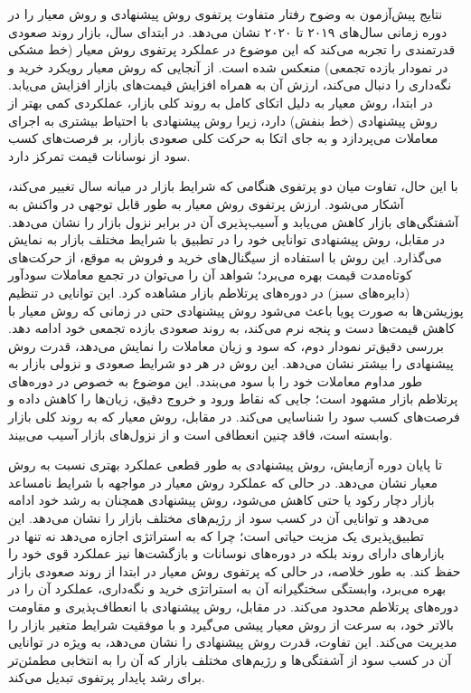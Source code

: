 نتایج پیش‌آزمون به وضوح رفتار متفاوت پرتفوی روش پیشنهادی و روش معیار را در دوره زمانی سال‌های ۲۰۱۹ تا ۲۰۲۰ نشان می‌دهد. در ابتدای سال، بازار روند صعودی قدرتمندی را تجربه می‌کند که این موضوع در عملکرد پرتفوی روش معیار (خط مشکی در نمودار بازده تجمعی) منعکس شده است. از آنجایی که روش معیار رویکرد خرید و نگه‌داری را دنبال می‌کند، ارزش آن به همراه افزایش قیمت‌های بازار افزایش می‌یابد. در ابتدا، روش معیار به دلیل اتکای کامل به روند کلی بازار، عملکردی کمی بهتر از روش پیشنهادی (خط بنفش) دارد، زیرا روش پیشنهادی با احتیاط بیشتری به اجرای معاملات می‌پردازد و به جای اتکا به حرکت کلی صعودی بازار، بر فرصت‌های کسب سود از نوسانات قیمت تمرکز دارد.

با این حال، تفاوت میان دو پرتفوی هنگامی که شرایط بازار در میانه سال تغییر می‌کند، آشکار می‌شود. ارزش پرتفوی روش معیار به طور قابل توجهی در واکنش به آشفتگی‌های بازار کاهش می‌یابد و آسیب‌پذیری آن در برابر نزول بازار را نشان می‌دهد. در مقابل، روش پیشنهادی توانایی خود را در تطبیق با شرایط مختلف بازار به نمایش می‌گذارد. این روش با استفاده از سیگنال‌های خرید و فروش به موقع، از حرکت‌های کوتاه‌مدت قیمت بهره می‌برد؛ شواهد آن را می‌توان در تجمع معاملات سودآور (دایره‌های سبز) در دوره‌های پرتلاطم بازار مشاهده کرد. این توانایی در تنظیم پوزیشن‌ها به صورت پویا باعث می‌شود روش پیشنهادی حتی در زمانی که روش معیار با کاهش قیمت‌ها دست و پنجه نرم می‌کند، به روند صعودی بازده تجمعی خود ادامه دهد. بررسی دقیق‌تر نمودار دوم، که سود و زیان معاملات را نمایش می‌دهد، قدرت روش پیشنهادی را بیشتر نشان می‌دهد. این روش در هر دو شرایط صعودی و نزولی بازار به طور مداوم معاملات خود را با سود می‌بندد. این موضوع به خصوص در دوره‌های پرتلاطم بازار مشهود است؛ جایی که نقاط ورود و خروج دقیق، زیان‌ها را کاهش داده و فرصت‌های کسب سود را شناسایی می‌کند. در مقابل، روش معیار که به روند کلی بازار وابسته است، فاقد چنین انعطافی است و از نزول‌های بازار آسیب می‌بیند.

تا پایان دوره آزمایش، روش پیشنهادی به طور قطعی عملکرد بهتری نسبت به روش معیار نشان می‌دهد. در حالی که عملکرد روش معیار در مواجهه با شرایط نامساعد بازار دچار رکود یا حتی کاهش می‌شود، روش پیشنهادی همچنان به رشد خود ادامه می‌دهد و توانایی آن در کسب سود از رژیم‌های مختلف بازار را نشان می‌دهد. این تطبیق‌پذیری یک مزیت حیاتی است؛ چرا که به استراتژی اجازه می‌دهد نه تنها در بازارهای دارای روند بلکه در دوره‌های نوسانات و بازگشت‌ها نیز عملکرد قوی خود را حفظ کند. به طور خلاصه، در حالی که پرتفوی روش معیار در ابتدا از روند صعودی بازار بهره می‌برد، وابستگی سختگیرانه آن به استراتژی خرید و نگه‌داری، عملکرد آن را در دوره‌های پرتلاطم محدود می‌کند. در مقابل، روش پیشنهادی با انعطاف‌پذیری و مقاومت بالاتر خود، به سرعت از روش معیار پیشی می‌گیرد و با موفقیت شرایط متغیر بازار را مدیریت می‌کند. این تفاوت، قدرت روش پیشنهادی را نشان می‌دهد، به ویژه در توانایی آن در کسب سود از آشفتگی‌ها و رژیم‌های مختلف بازار که آن را به انتخابی مطمئن‌تر برای رشد پایدار پرتفوی تبدیل می‌کند.


